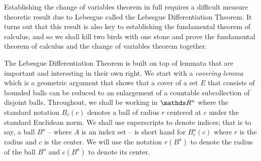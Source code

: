 Establishing the change of variables theorem in full requires a difficult
measure theoretic result due to Lebesgue called the Lebesgue Differentiation
Theorem. It turns out that this result is also key to establishing
the fundamental theorem of calculus, and so we shall kill two birds with one stone and prove the 
fundamental theorem of calculus and the change of variables theorem together.

The Lebesgue Differentiation Theorem is built on top of lemmata that are important and interesting in their own right. We start with a \emph{covering lemma} 
which is a geometric argument that shows that a cover of a set $E$ that consists of bounded balls can be reduced to an enlargement of a countable subcollection of disjoint balls. Throughout, we shall be working in $\R^n$ where the standard notation $B_r\left(c\right)$ denotes a ball of radius $r$ 
centered at $c$ under the standard Euclidean norm. We shall use superscripts to denote indices; that is to say, a ball $B^a$ -- where $A$ is an index set -- is short hand for
$B^a_r(c)$ where $r$ is the radius and $c$ is the center. We will use the notation $r(B^a)$ to denote the radius of the ball $B^a$ and $c(B^a)$ to denote its center. 

